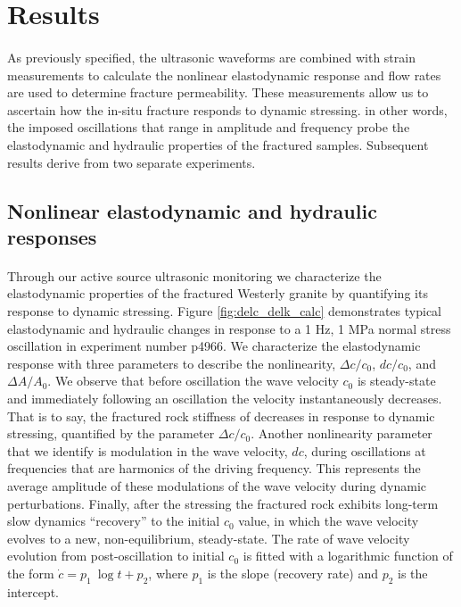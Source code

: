 
\section{Results}
\paragraph{}
As previously specified, the ultrasonic waveforms are combined with strain measurements to calculate the nonlinear elastodynamic response and flow rates are used to determine fracture permeability. These measurements allow us to ascertain how the in-situ fracture responds to dynamic stressing. in other words, the imposed oscillations that range in amplitude and frequency probe the elastodynamic and hydraulic properties of the fractured samples. Subsequent results derive from two separate experiments. 

\subsection{Nonlinear elastodynamic and hydraulic responses}
\paragraph{}
Through our active source ultrasonic monitoring we characterize the elastodynamic properties of the fractured Westerly granite by quantifying its response to dynamic stressing. Figure \ref{fig:delc_delk_calc} demonstrates typical elastodynamic and hydraulic changes in response to a 1 Hz, 1 MPa normal stress oscillation in experiment number p4966. We characterize the elastodynamic response with three parameters to describe the nonlinearity, $ \Delta c/c_0 $, $ dc/c_0 $, and $ \Delta A/A_0 $. We observe that before oscillation the wave velocity $ c_0 $ is steady-state and immediately following an oscillation the velocity instantaneously decreases. That is to say, the fractured rock stiffness of decreases in response to dynamic stressing, quantified by the parameter $ \Delta c/c_0 $. 
Another nonlinearity parameter that we identify is modulation in the wave velocity, $ dc $, during oscillations at frequencies that are harmonics of the driving frequency. This represents the average amplitude of these modulations of the wave velocity during dynamic perturbations. Finally, after the stressing the fractured rock exhibits long-term slow dynamics ``recovery'' to the initial $ c_0 $ value, in which the wave velocity evolves to a new, non-equilibrium, steady-state. The rate of wave velocity evolution from post-oscillation to initial $ c_0 $ is fitted with a logarithmic function of the form $ \dot c = p_1\ \log{t} + p_2 $, where $p_1$ is the slope (recovery rate) and $p_2$ is the intercept.
